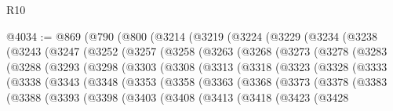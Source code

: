 \begin{lexlean}{R10}
\begin{coremodule}
@4034 := @869
    (@790
      (@800
        (@3214
          (@3219
            (@3224
              (@3229
                (@3234
                  (@3238
                    (@3243
                      (@3247
                        (@3252
                          (@3257
                            (@3258
                              (@3263
                                (@3268
                                  (@3273
                                    (@3278
                                      (@3283
                                        (@3288
                                          (@3293
                                            (@3298
                                              (@3303
                                                (@3308
                                                  (@3313
                                                    (@3318
                                                      (@3323
                                                        (@3328
                                                          (@3333
                                                            (@3338
                                                              (@3343
                                                                (@3348
                                                                  (@3353
                                                                    (@3358
                                                                      (@3363
                                                                        (@3368
                                                                          (@3373
                                                                            (@3378
                                                                              (@3383
                                                                                (@3388
                                                                                  (@3393
                                                                                    (@3398
                                                                                      (@3403
                                                                                        (@3408
                                                                                          (@3413
                                                                                            (@3418
                                                                                              (@3423
                                                                                                (@3428

\end{coremodule}
\end{lexlean}
